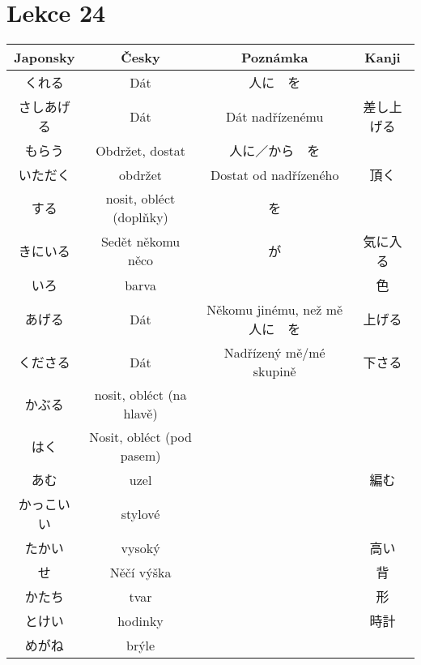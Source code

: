 \section{Lekce 24}
\begin{table}[H]
\centering
\begin{tabular}{cccc}
\hline
Japonsky & Česky                     & Poznámka                   & Kanji \\
\hline
くれる      & Dát                       & 人に　を                       &       \\
さしあげる    & Dát                       & Dát nadřízenému            & 差し上げる \\
もらう      & Obdržet, dostat           & 人に／から　を                    &       \\
いただく     & obdržet                   & Dostat od nadřízeného      & 頂く    \\
する       & nosit, obléct (doplňky)   & を                          &       \\
きにいる     & Sedět někomu něco         & が                          & 気に入る  \\
いろ       & barva                     && 色                                 \\
あげる      & Dát                       & Někomu jinému, než mě　人に　を & 上げる   \\
くださる     & Dát                       & Nadřízený mě/mé skupině    & 下さる   \\
かぶる      & nosit, obléct (na hlavě)  &                            &       \\
はく       & Nosit, obléct (pod pasem) &                            &       \\
あむ       & uzel                      && 編む                                \\
かっこいい    & stylové                   &&                                   \\
たかい      & vysoký                    && 高い                               \\
せ        & Něčí výška                && 背                                \\
かたち      & tvar                      && 形                                 \\
とけい      & hodinky                   && 時計                                \\
めがね      & brýle                     &  &                                \\

\end{tabular}
\end{table}
